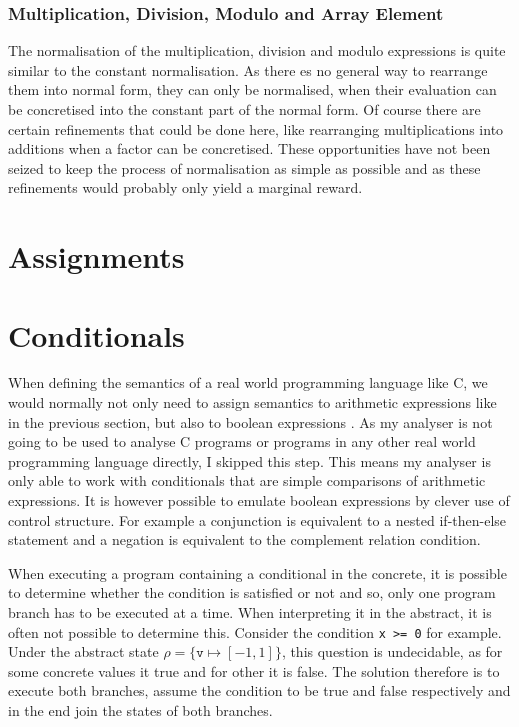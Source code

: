 \documentclass{report}
\begin{document}
\subsubsection{Multiplication, Division, Modulo and Array Element}

The normalisation of the multiplication, division and modulo expressions is quite similar to the constant normalisation. As there es no general way to rearrange them into normal form, they can only be normalised, when their evaluation can be concretised into the constant part of the normal form. Of course there are certain refinements that could be done here, like rearranging multiplications into additions when a factor can be concretised. These opportunities have not been seized to keep the process of normalisation as simple as possible and as these refinements would probably only yield a marginal reward. 

\section{Assignments}

\section{Conditionals}\label{sec:conditions}

When defining the semantics of a real world programming language like C, we would normally not only need to assign semantics to arithmetic expressions like in the previous section, but also to boolean expressions \cite{scott1971}. As my analyser is not going to be used to analyse C programs or programs in any other real world programming language directly, I skipped this step. This means my analyser is only able to work with conditionals that are simple comparisons of arithmetic expressions. It is however possible to emulate boolean expressions by clever use of control structure. For example a conjunction is equivalent to a nested if-then-else statement and a negation is equivalent to the complement relation condition.

When executing a program containing a conditional in the concrete, it is possible to determine whether the condition is satisfied or not and so, only one program branch has to be executed at a time. When interpreting it in the abstract, it is often not possible to determine this. Consider the condition \texttt{x~>=~0} for example. Under the abstract state $\rho=\{\mathtt{v}\mapsto[-1,1]\}$, this question is undecidable, as for some concrete values it true and for other it is false. The solution therefore is to execute both branches, assume the condition to be true and false respectively and in the end join the states of both branches.
\end{document}
